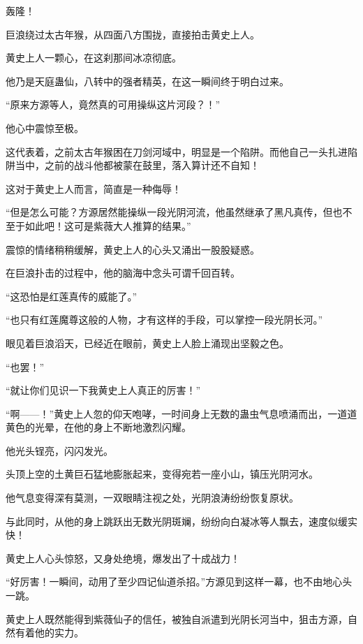 
\begin{this_body}



轰隆！

巨浪绕过太古年猴，从四面八方围拢，直接拍击黄史上人。

黄史上人一颗心，在这刹那间冰凉彻底。

他乃是天庭蛊仙，八转中的强者精英，在这一瞬间终于明白过来。

“原来方源等人，竟然真的可用操纵这片河段？！”

他心中震惊至极。

这代表着，之前太古年猴困在刀剑河域中，明显是一个陷阱。而他自己一头扎进陷阱当中，之前的战斗他都被蒙在鼓里，落入算计还不自知！

这对于黄史上人而言，简直是一种侮辱！

“但是怎么可能？方源居然能操纵一段光阴河流，他虽然继承了黑凡真传，但也不至于如此吧！这可是紫薇大人推算的结果。”

震惊的情绪稍稍缓解，黄史上人的心头又涌出一股股疑惑。

在巨浪扑击的过程中，他的脑海中念头可谓千回百转。

“这恐怕是红莲真传的威能了。”

“也只有红莲魔尊这般的人物，才有这样的手段，可以掌控一段光阴长河。”

眼见着巨浪滔天，已经近在眼前，黄史上人脸上涌现出坚毅之色。

“也罢！”

“就让你们见识一下我黄史上人真正的厉害！”

“啊——！”黄史上人忽的仰天咆哮，一时间身上无数的蛊虫气息喷涌而出，一道道黄色的光晕，在他的身上不断地激烈闪耀。

他光头锃亮，闪闪发光。

头顶上空的土黄巨石猛地膨胀起来，变得宛若一座小山，镇压光阴河水。

他气息变得深有莫测，一双眼睛注视之处，光阴浪涛纷纷恢复原状。

与此同时，从他的身上跳跃出无数光阴斑斓，纷纷向白凝冰等人飘去，速度似缓实快！

黄史上人心头惊怒，又身处绝境，爆发出了十成战力！

“好厉害！一瞬间，动用了至少四记仙道杀招。”方源见到这样一幕，也不由地心头一跳。

黄史上人既然能得到紫薇仙子的信任，被独自派遣到光阴长河当中，狙击方源，自然有着他的实力。


\end{this_body}
